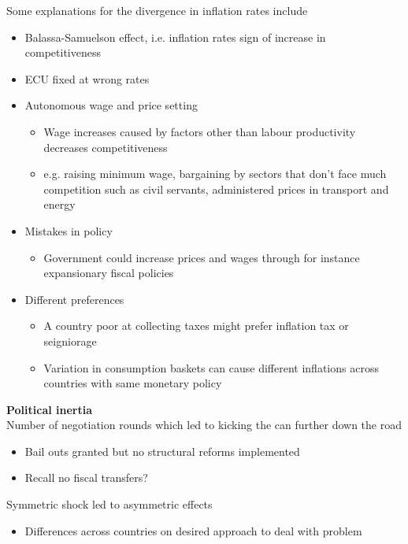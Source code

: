\documentclass{beamer}
\begin{document}
\begin{frame}
  Some explanations for the divergence in inflation rates include
\begin{itemize}
  \item Balassa-Samuelson effect, i.e. inflation rates sign of increase in competitiveness 
  \item ECU fixed at wrong rates
  \item Autonomous wage and price setting
  \begin{itemize}
    \item Wage increases caused by factors other than labour productivity decreases competitiveness
    \item e.g. raising minimum wage, bargaining by sectors that don't face much competition such as civil servants, administered prices in transport and energy
  \end{itemize}
  \item Mistakes in policy
  \begin{itemize}
    \item Government could increase prices and wages through for instance expansionary fiscal policies
  \end{itemize}  
  \item Different preferences
  \begin{itemize}
    \item A country poor at collecting taxes might prefer inflation tax or seigniorage
    \item Variation in consumption baskets can cause different inflations across countries with same monetary policy
  \end{itemize}
\end{itemize}
\end{frame}


\begin{frame}
  \textbf{Political inertia}\\
  Number of negotiation rounds which led to kicking the can further down the road
  \begin{itemize}
    \item Bail outs granted but no structural reforms implemented
    \item Recall no fiscal transfers?
  \end{itemize}
  \medskip
  Symmetric shock led to asymmetric effects
  \begin{itemize}
    \item Differences across countries on desired approach to deal with problem
  \end{itemize}
\end{frame}
\end{document}

